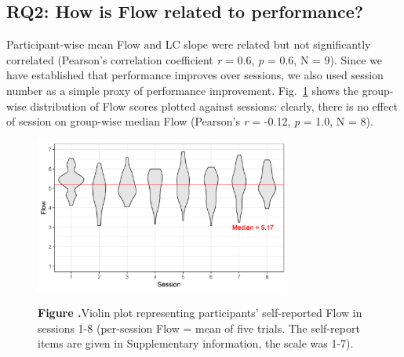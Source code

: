\documentclass{frontierstyle/frontiersSCNS}
\newcommand{\nicewidth}{0.75\textwidth}
\begin{document}
\subsection{RQ2: How is Flow related to performance?}

Participant-wise mean Flow and LC slope were related but not significantly correlated (Pearson's correlation coefficient {\it r} = 0.6, {\it p} = 0.6, N = 9). %
Since we have established that performance improves over sessions, we also used session number as a simple proxy of performance improvement. Fig.~\ref{fig:FlowVssn} shows the group-wise distribution of Flow scores plotted against sessions: clearly, there is no effect of session on group-wise median Flow (Pearson's {\it r} = -0.12, {\it p} = 1.0, N = 8).%

\begin{figure}[!b]
\begin{center}
	\includegraphics[width=\nicewidth]{4_session_fss2}
\end{center}
	\textbf{\label{fig:FlowVssn} Figure .}{Violin plot representing participants' self-reported Flow in sessions 1-8 (per-session Flow = mean of five trials. The self-report items are given in Supplementary information, the scale was 1-7).}
\end{figure}
\end{document}
